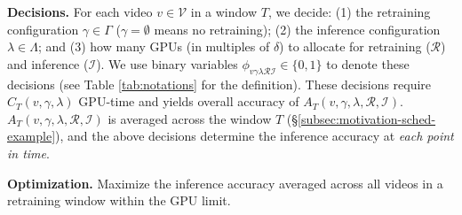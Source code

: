 \noindent\textbf{Decisions.} For each video $v\in\mathcal{V}$ in a window $T$, we decide: (1) the retraining configuration $\gamma\in\Gamma$ ($\gamma = \emptyset$ means no retraining); (2) the inference configuration $\lambda\in\Lambda$; and (3) how many GPUs (in multiples of $\delta$) %
to allocate for retraining ($\mathcal{R}$) %
and inference ($\mathcal{I}$). %
We use binary variables $\phi_{v\gamma\lambda\mathcal{R}\mathcal{I}}\in\{0,1\}$ to denote these decisions (see Table \ref{tab:notations} for the definition). 
These decisions require $C_T(v, \gamma, \lambda)$ GPU-time and yields overall accuracy of $A_T(v, \gamma, \lambda, \mathcal{R}, \mathcal{I})$. $A_T(v, \gamma, \lambda, \mathcal{R}, \mathcal{I})$ is averaged across the window $T$ (\S\ref{subsec:motivation-sched-example}), and the above decisions determine the inference accuracy at {\em each point in time}.




\noindent\textbf{Optimization.} Maximize the inference accuracy averaged across all videos in a retraining window within the GPU limit. 

